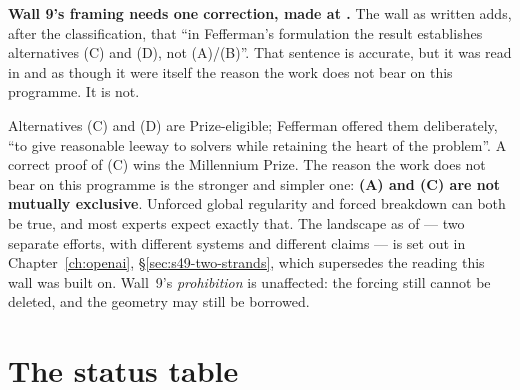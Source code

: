 \begin{record}
\textbf{Wall 9's framing needs one correction, made at .} The wall as
written adds, after the classification, that ``in Fefferman's formulation the
result establishes alternatives (C) and (D), not (A)/(B)''. That sentence is
accurate, but it was read in  and  as though it were itself the
reason the work does not bear on this programme. It is not.

\smallskip
Alternatives (C) and (D) are Prize-eligible; Fefferman offered them
deliberately, ``to give reasonable leeway to solvers while retaining the heart
of the problem''. A correct proof of (C) wins the Millennium Prize. The reason
the work does not bear on this programme is the stronger and simpler one:
\textbf{(A) and (C) are not mutually exclusive}. Unforced global regularity
and forced breakdown can both be true, and most experts expect exactly that.
The landscape as of  --- two separate efforts, with different systems
and different claims --- is set out in Chapter~\ref{ch:openai},
\S\ref{sec:s49-two-strands}, which supersedes the  reading this wall was
built on. Wall~9's \emph{prohibition} is unaffected: the forcing still cannot
be deleted, and the geometry may still be borrowed.
\end{record}

\section{The status table}
\label{sec:walls-table}

